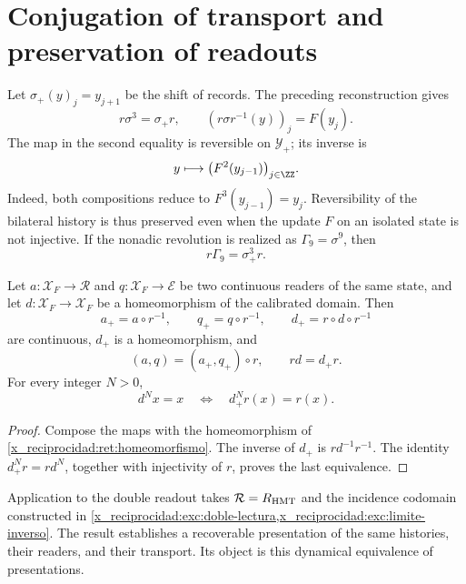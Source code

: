 \section{Conjugation of transport and preservation of readouts}

Let \(\sigma_+(y)_j=y_{j+1}\) be the shift of records.
The preceding reconstruction gives
\begin{equation}
 r\sigma^3=\sigma_+r,\qquad
 (r\sigma r^{-1}(y))_j=F(y_j).
 \label{x_reciprocidad:ret:conjugacion}
\end{equation}
The map in the second equality is reversible on
\(\mathscr Y_+\); its inverse is
\[
 y\longmapsto\bigl(F^2(y_{j-1})\bigr)_{j\in\ZZ}.
\]
Indeed, both compositions reduce to
\(F^3(y_{j-1})=y_j\).
Reversibility of the bilateral history is thus preserved even
when the update \(F\) on an isolated state is not injective.
If the nonadic revolution is realized as \(\Gamma_9=\sigma^9\), then
\begin{equation}
 r\Gamma_9=\sigma_+^3r.
 \label{x_reciprocidad:ret:vuelta-nonadica}
\end{equation}

\begin{corollary}
\label{x_reciprocidad:ret:lecturas}
Let \(a:\mathscr X_F\to\mathcal R\) and
\(q:\mathscr X_F\to\mathcal E\) be two continuous readers of the same
state, and let \(d:\mathscr X_F\to\mathscr X_F\) be a homeomorphism of the
calibrated domain. Then
\[
 a_+=a\circ r^{-1},\qquad
 q_+=q\circ r^{-1},\qquad
 d_+=r\circ d\circ r^{-1}
\]
are continuous, \(d_+\) is a homeomorphism, and
\begin{equation}
 (a,q)=(a_+,q_+)\circ r,\qquad rd=d_+r.
 \label{x_reciprocidad:ret:factorizacion}
\end{equation}
For every integer \(N>0\),
\[
 d^Nx=x\quad\Longleftrightarrow\quad d_+^Nr(x)=r(x).
\]
\end{corollary}
\begin{proof}
Compose the maps with the homeomorphism of
\cref{x_reciprocidad:ret:homeomorfismo}. The inverse of \(d_+\) is
\(rd^{-1}r^{-1}\). The identity
\(d_+^Nr=rd^N\), together with injectivity of \(r\), proves the
last equivalence.
\end{proof}

Application to the double readout takes
\(\mathcal R=R_{\rm HMT}\) and the incidence codomain constructed in
\cref{x_reciprocidad:exc:doble-lectura,x_reciprocidad:exc:limite-inverso}.
The result establishes a recoverable presentation of the same
histories, their readers, and their transport. Its object is this
dynamical equivalence of presentations.


